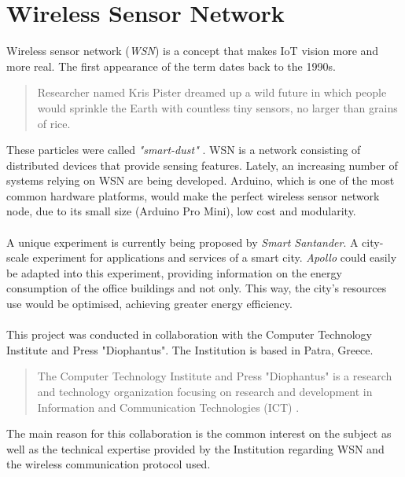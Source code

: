 \documentclass[12pt,a4paper,draft]{report}
\begin{document}
\section{Wireless Sensor Network}
%
Wireless sensor network (\textit{WSN}) is a concept that makes IoT vision more and more real.
The first appearance of the term dates back to the 1990s.
\begin{quote}
    Researcher named Kris Pister dreamed up a wild future in which people would sprinkle the Earth with countless tiny sensors, no larger than grains of rice. \cite{website:smartdust} 
\end{quote}
%
These particles were called \textit{"smart-dust"} \cite{website:smartdust}.
WSN is a network consisting of distributed devices that provide sensing features.
Lately, an increasing number of systems relying on WSN are being developed.
Arduino, which is one of the most common hardware platforms, would make the perfect wireless sensor network node, due to its small size (Arduino Pro Mini), low cost and modularity.\\
\ \\
A unique experiment is currently being proposed by \textit{Smart Santander}.
A city-scale experiment for applications and services of a smart city.
\emph{Apollo} could easily be adapted into this experiment, providing information on the energy consumption of the office buildings and not only.
This way, the city's resources use would be optimised, achieving greater energy efficiency.\\
\ \\
%
This project was conducted in collaboration with the Computer Technology Institute and Press "Diophantus". The Institution is based in Patra, Greece.
%
\begin{quote}
	The Computer Technology Institute and Press "Diophantus" is a research and technology organization focusing on research and development in Information and Communication Technologies (ICT) \cite{website:cti}.
\end{quote}
%
The main reason for this collaboration is the common interest on the subject as well as the technical expertise provided by the Institution regarding WSN and the wireless communication protocol used.
%
\newpage
%
\end{document}

